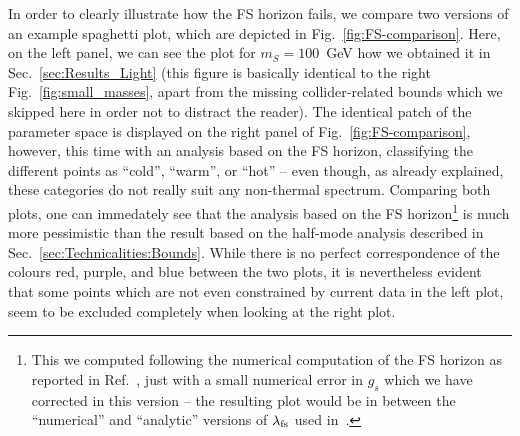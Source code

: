 In order to clearly illustrate how the FS horizon fails, we compare two versions of an example spaghetti plot, which are depicted in Fig.~\ref{fig:FS-comparison}. Here, on the left panel, we can see the plot for $m_S = 100$~GeV how we obtained it in Sec.~\ref{sec:Results_Light} (this figure is basically identical to the right Fig.~\ref{fig:small_masses}, apart from the missing collider-related bounds which we skipped here in order not to distract the reader). The identical patch of the parameter space is displayed on the right panel of Fig.~\ref{fig:FS-comparison}, however, this time with an analysis based on the FS horizon, classifying the different points as ``cold'', ``warm'', or ``hot'' -- even though, as already explained, these categories do not really suit any non-thermal spectrum. Comparing both plots, one can immedately see that the analysis based on the FS horizon\footnote{This we computed following the numerical computation of the FS horizon as reported in Ref.~\cite{Adulpravitchai:2014xna}, just with a small numerical error in $g_s$ which we have corrected in this version -- the resulting plot would be in between the ``numerical'' and ``analytic'' versions of $\lambda_{\rm fs}$ used in~\cite{Adulpravitchai:2014xna}.} is much more pessimistic than the result based on the half-mode analysis described in Sec.~\ref{sec:Technicalities:Bounds}. While there is no perfect correspondence of the colours red, purple, and blue between the two plots, it is nevertheless evident that some points which are not even constrained by current data in the left plot, seem to be excluded completely when looking at the right plot.


